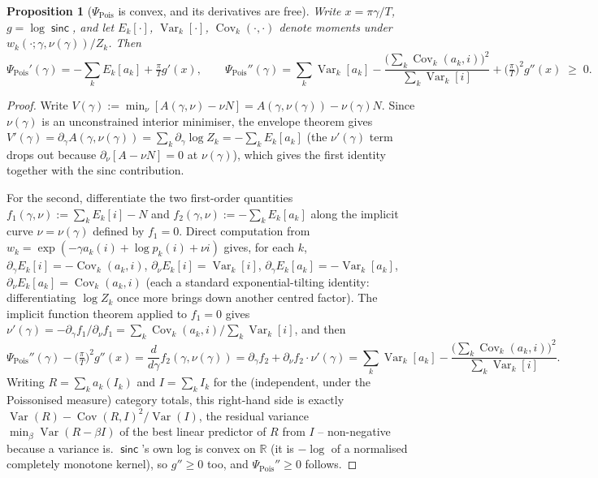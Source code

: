 \documentclass[11pt]{article}
\newtheorem{proposition}{Proposition}
\newcommand{\Var}{\operatorname{Var}}
\newcommand{\Cov}{\operatorname{Cov}}
\newcommand{\sinck}{\operatorname{\mathsf{sinc}}}
\begin{document}
\begin{proposition}[$\Psi_{\mathrm{Pois}}$ is convex, and its derivatives are free]
\label{prop:gammaderiv}
Write $x=\pi\gamma/T$, $g=\log\sinck$, and let $E_k[\cdot]$, $\Var_k[\cdot]$, $\Cov_k(\cdot,\cdot)$
denote moments under $w_k(\cdot;\gamma,\nu(\gamma))/Z_k$. Then
\[
  \Psi_{\mathrm{Pois}}'(\gamma)=-\sum_kE_k[a_k]+\tfrac{\pi}{T}g'(x),
  \qquad
  \Psi_{\mathrm{Pois}}''(\gamma)=\sum_k\Var_k[a_k]-\frac{\big(\sum_k\Cov_k(a_k,i)\big)^2}{\sum_k\Var_k[i]}+\Big(\tfrac{\pi}{T}\Big)^2g''(x)\;\ge\;0.
\]
\end{proposition}
\begin{proof}
Write $V(\gamma):=\min_\nu[A(\gamma,\nu)-\nu N]=A(\gamma,\nu(\gamma))-\nu(\gamma)N$. Since
$\nu(\gamma)$ is an unconstrained interior minimiser, the envelope theorem gives
$V'(\gamma)=\partial_\gamma A(\gamma,\nu(\gamma))=\sum_k\partial_\gamma\log Z_k=-\sum_kE_k[a_k]$
(the $\nu'(\gamma)$ term drops out because $\partial_\nu[A-\nu N]=0$ at $\nu(\gamma)$), which gives
the first identity together with the sinc contribution.

For the second, differentiate the two first-order quantities
$f_1(\gamma,\nu):=\sum_kE_k[i]-N$ and $f_2(\gamma,\nu):=-\sum_kE_k[a_k]$
along the implicit curve $\nu=\nu(\gamma)$ defined by $f_1=0$. Direct computation from
$w_k=\exp(-\gamma a_k(i)+\log p_k(i)+\nu i)$ gives, for each $k$,
$\partial_\gamma E_k[i]=-\Cov_k(a_k,i)$, $\partial_\nu E_k[i]=\Var_k[i]$,
$\partial_\gamma E_k[a_k]=-\Var_k[a_k]$, $\partial_\nu E_k[a_k]=\Cov_k(a_k,i)$ (each a standard
exponential-tilting identity: differentiating $\log Z_k$ once more brings down another centred
factor). The implicit function theorem applied to $f_1=0$ gives
$\nu'(\gamma)=-\partial_\gamma f_1/\partial_\nu f_1=\sum_k\Cov_k(a_k,i)/\sum_k\Var_k[i]$, and then
\[
  \Psi_{\mathrm{Pois}}''(\gamma)-\Big(\tfrac{\pi}{T}\Big)^2g''(x)
  =\frac{d}{d\gamma}f_2(\gamma,\nu(\gamma))
  =\partial_\gamma f_2+\partial_\nu f_2\cdot\nu'(\gamma)
  =\sum_k\Var_k[a_k]-\frac{\big(\sum_k\Cov_k(a_k,i)\big)^2}{\sum_k\Var_k[i]}.
\]
Writing $R=\sum_ka_k(I_k)$ and $I=\sum_kI_k$ for the (independent, under the Poissonised measure)
category totals, this right-hand side is exactly $\Var(R)-\Cov(R,I)^2/\Var(I)$, the residual
variance $\min_\beta\Var(R-\beta I)$ of the best linear predictor of $R$ from $I$ -- non-negative
because a variance is. $\sinck$'s own log is convex on $\mathbb R$ (it is $-\log$ of a normalised
completely monotone kernel), so $g''\ge0$ too, and $\Psi_{\mathrm{Pois}}''\ge0$ follows.
\end{proof}
\end{document}
